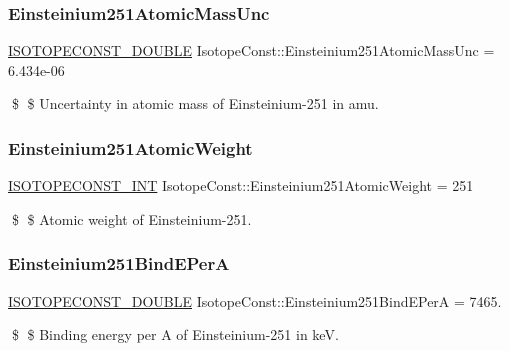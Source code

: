 \subsubsection{\texorpdfstring{Einsteinium251\+Atomic\+Mass\+Unc}{Einsteinium251AtomicMassUnc}}
{\footnotesize\ttfamily \mbox{\hyperlink{group___isotope_const-_macros_ga8f45a7272ce02c0b4c65c44636ed719a}{I\+S\+O\+T\+O\+P\+E\+C\+O\+N\+S\+T\+\_\+\+D\+O\+U\+B\+LE}} Isotope\+Const\+::\+Einsteinium251\+Atomic\+Mass\+Unc = 6.\+434e-\/06}

\$ \$ Uncertainty in atomic mass of Einsteinium-\/251 in amu. \mbox{\label{group___isotope_const-_einsteinium-_es251_gab9b9cd0e8dae9a7f8815ab7467484967}} 
\subsubsection{\texorpdfstring{Einsteinium251\+Atomic\+Weight}{Einsteinium251AtomicWeight}}
{\footnotesize\ttfamily \mbox{\hyperlink{group___isotope_const-_macros_ga5f18360b3e99483a35c32d789e62621c}{I\+S\+O\+T\+O\+P\+E\+C\+O\+N\+S\+T\+\_\+\+I\+NT}} Isotope\+Const\+::\+Einsteinium251\+Atomic\+Weight = 251}

\$ \$ Atomic weight of Einsteinium-\/251. \mbox{\label{group___isotope_const-_einsteinium-_es251_ga2caf977d8190444792e74a47f50ecd5e}} 
\subsubsection{\texorpdfstring{Einsteinium251\+Bind\+E\+PerA}{Einsteinium251BindEPerA}}
{\footnotesize\ttfamily \mbox{\hyperlink{group___isotope_const-_macros_ga8f45a7272ce02c0b4c65c44636ed719a}{I\+S\+O\+T\+O\+P\+E\+C\+O\+N\+S\+T\+\_\+\+D\+O\+U\+B\+LE}} Isotope\+Const\+::\+Einsteinium251\+Bind\+E\+PerA = 7465.}

\$ \$ Binding energy per A of Einsteinium-\/251 in keV. \mbox{\label{group___isotope_const-_einsteinium-_es251_ga80971f53d2e0a00912a095df08f6643f}} 
